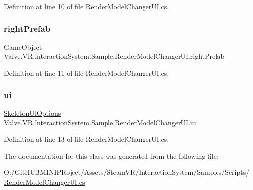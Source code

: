 Definition at line 10 of file Render\+Model\+Changer\+U\+I.\+cs.

\mbox{\label{class_valve_1_1_v_r_1_1_interaction_system_1_1_sample_1_1_render_model_changer_u_i_a7685910ddfed4cc210144fdc1ee80bb9}} 
\subsubsection{\texorpdfstring{rightPrefab}{rightPrefab}}
{\footnotesize\ttfamily Game\+Object Valve.\+V\+R.\+Interaction\+System.\+Sample.\+Render\+Model\+Changer\+U\+I.\+right\+Prefab}



Definition at line 11 of file Render\+Model\+Changer\+U\+I.\+cs.

\mbox{\label{class_valve_1_1_v_r_1_1_interaction_system_1_1_sample_1_1_render_model_changer_u_i_aba11aa37fc7200166c1d17719e4efdae}} 
\subsubsection{\texorpdfstring{ui}{ui}}
{\footnotesize\ttfamily \mbox{\hyperlink{class_valve_1_1_v_r_1_1_interaction_system_1_1_sample_1_1_skeleton_u_i_options}{Skeleton\+U\+I\+Options}} Valve.\+V\+R.\+Interaction\+System.\+Sample.\+Render\+Model\+Changer\+U\+I.\+ui\hspace{0.3cm}{\ttfamily [protected]}}



Definition at line 13 of file Render\+Model\+Changer\+U\+I.\+cs.



The documentation for this class was generated from the following file\+:\begin{DoxyCompactItemize}
\item 
O\+:/\+Git\+H\+U\+B\+M\+I\+N\+I\+P\+Roject/\+Assets/\+Steam\+V\+R/\+Interaction\+System/\+Samples/\+Scripts/\mbox{\hyperlink{_render_model_changer_u_i_8cs}{Render\+Model\+Changer\+U\+I.\+cs}}\end{DoxyCompactItemize}
